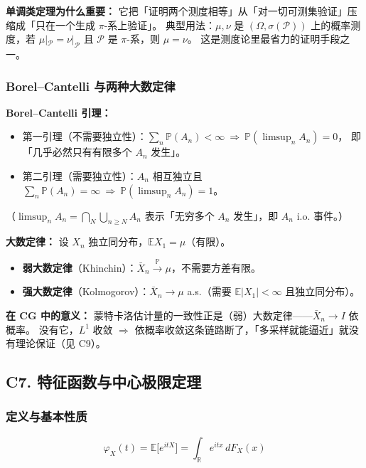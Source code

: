 \textbf{单调类定理为什么重要：} 它把「证明两个测度相等」从「对一切可测集验证」压缩成「只在一个生成 $\pi$-系上验证」。
典型用法：$\mu,\nu$ 是 $(\Omega,\sigma(\mathcal P))$ 上的概率测度，若 $\mu|_{\mathcal P}=\nu|_{\mathcal P}$ 且 $\mathcal P$ 是 $\pi$-系，则 $\mu=\nu$。
这是测度论里最省力的证明手段之一。

\subsubsection{Borel--Cantelli 与两种大数定律}

\textbf{Borel--Cantelli 引理：}
\begin{itemize}
  \item 第一引理（不需要独立性）：$\sum_n\mathbb P(A_n)<\infty\ \Longrightarrow\ \mathbb P(\limsup_n A_n)=0$，
        即「几乎必然只有有限多个 $A_n$ 发生」。
  \item 第二引理（需要独立性）：$A_n$ 相互独立且 $\sum_n\mathbb P(A_n)=\infty\ \Longrightarrow\ \mathbb P(\limsup_n A_n)=1$。
\end{itemize}
（$\limsup_n A_n=\bigcap_N\bigcup_{n\ge N}A_n$ 表示「无穷多个 $A_n$ 发生」，即 $A_n$ i.o. 事件。）

\textbf{大数定律：} 设 $X_n$ 独立同分布，$\mathbb E X_1=\mu$（有限）。
\begin{itemize}
  \item \textbf{弱大数定律}（Khinchin）：$\bar X_n\xrightarrow{\ \mathbb P\ }\mu$，不需要方差有限。
  \item \textbf{强大数定律}（Kolmogorov）：$\bar X_n\to\mu$ a.s.（需要 $\mathbb E|X_1|<\infty$ 且独立同分布）。
\end{itemize}

\textbf{在 CG 中的意义：} 蒙特卡洛估计量的一致性正是（弱）大数定律——$\bar X_n\to I$ 依概率。
没有它，$L^1$ 收敛 $\Rightarrow$ 依概率收敛这条链路断了，「多采样就能逼近」就没有理论保证（见 C9）。

\subsection{C7. 特征函数与中心极限定理}

\subsubsection{定义与基本性质}

\[
\varphi_X(t)=\mathbb E\big[e^{itX}\big]=\int_{\mathbb R}e^{itx}\,dF_X(x)
\]


